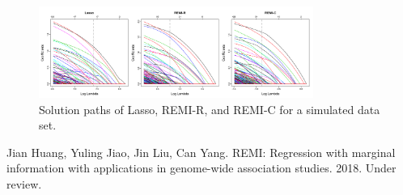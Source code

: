 \documentclass[11pt]{article}
\begin{document}
\begin{figure}[ht]
	\centering
	\includegraphics[width=0.8\textwidth]{path_demo.png}

	\caption{Solution paths of Lasso, REMI-R, and REMI-C for a simulated data set.}
	\label{fig}
\end{figure}

\begin{thebibliography}{99}
 Jian Huang, Yuling Jiao, Jin Liu, Can Yang. REMI: Regression with marginal information with applications in genome-wide association studies. 2018. Under review.

\end{thebibliography}
\end{document}
